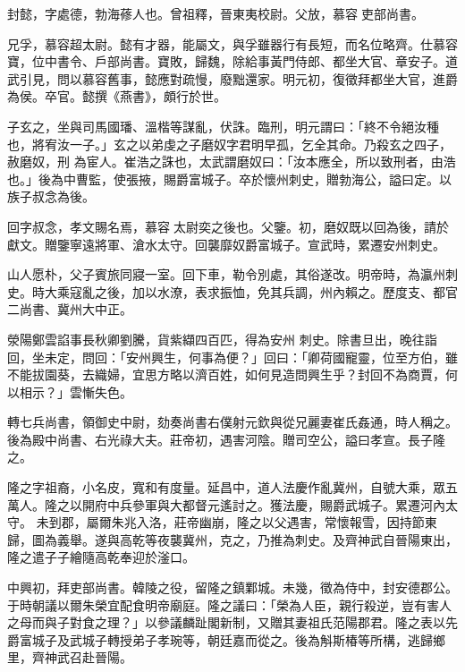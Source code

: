 \begin{pinyinscope}
 封懿，字處德，勃海蓚人也。曾祖釋，晉東夷校尉。父放，慕容吏部尚書。



 兄孚，慕容超太尉。懿有才器，能屬文，與孚雖器行有長短，而名位略齊。仕慕容寶，位中書令、戶部尚書。寶敗，歸魏，除給事黃門侍郎、都坐大官、章安子。道武引見，問以慕容舊事，懿應對疏慢，廢黜還家。明元初，復徵拜都坐大官，進爵為侯。卒官。懿撰《燕書》，頗行於世。



 子玄之，坐與司馬國璠、溫楷等謀亂，伏誅。臨刑，明元謂曰：「終不令絕汝種也，將宥汝一子。」玄之以弟虔之子磨奴字君明早孤，乞全其命。乃殺玄之四子，赦磨奴，刑
 為宦人。崔浩之誅也，太武謂磨奴曰：「汝本應全，所以致刑者，由浩也。」後為中曹監，使張掖，賜爵富城子。卒於懷州刺史，贈勃海公，謚曰定。以族子叔念為後。



 回字叔念，孝文賜名焉，慕容太尉奕之後也。父鑒。初，磨奴既以回為後，請於獻文。贈鑒寧遠將軍、滄水太守。回襲靡奴爵富城子。宣武時，累遷安州刺史。



 山人愿朴，父子賓旅同寢一室。回下車，勒令別處，其俗遂改。明帝時，為瀛州刺史。時大乘寇亂之後，加以水潦，表求振恤，免其兵調，州內賴之。歷度支、都官二尚書、冀州大中正。



 滎陽鄭雲諂事長秋卿劉騰，貨紫纈四百匹，得為安州
 刺史。除書旦出，晚往詣回，坐未定，問回：「安州興生，何事為便？」回曰：「卿荷國寵靈，位至方伯，雖不能拔園葵，去織婦，宜思方略以濟百姓，如何見造問興生乎？封回不為商賈，何以相示？」雲慚失色。



 轉七兵尚書，領御史中尉，劾奏尚書右僕射元欽與從兄麗妻崔氏姦通，時人稱之。後為殿中尚書、右光祿大夫。莊帝初，遇害河陰。贈司空公，謚曰孝宣。長子隆之。



 隆之字祖裔，小名皮，寬和有度量。延昌中，道人法慶作亂冀州，自號大乘，眾五萬人。隆之以開府中兵參軍與大都督元遙討之。獲法慶，賜爵武城子。累遷河內太守。
 未到郡，屬爾朱兆入洛，莊帝幽崩，隆之以父遇害，常懷報雪，因持節東歸，圖為義舉。遂與高乾等夜襲冀州，克之，乃推為刺史。及齊神武自晉陽東出，隆之遣子子繪隨高乾奉迎於滏口。



 中興初，拜吏部尚書。韓陵之役，留隆之鎮鄴城。未幾，徵為侍中，封安德郡公。于時朝議以爾朱榮宜配食明帝廟庭。隆之議曰：「榮為人臣，親行殺逆，豈有害人之母而與子對食之理？」以參議麟趾閣新制，又贈其妻祖氏范陽郡君。隆之表以先爵富城子及武城子轉授弟子孝琬等，朝廷嘉而從之。後為斛斯椿等所構，逃歸鄉里，齊神武召赴晉陽。




\end{pinyinscope}
